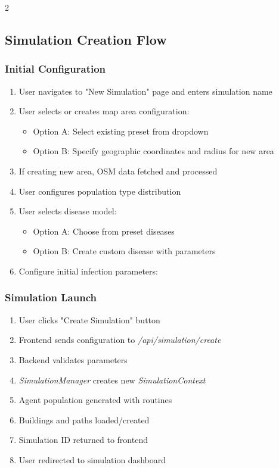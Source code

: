 \begin{multicols}{2}
\subsection{Simulation Creation Flow}

\subsubsection*{Initial Configuration}
\begin{enumerate}
    \item User navigates to "New Simulation" page and enters simulation name
    \item User selects or creates map area configuration:
    \begin{itemize}
        \item Option A: Select existing preset from dropdown
        \item Option B: Specify geographic coordinates and radius for new area
    \end{itemize}
    \item If creating new area, OSM data fetched and processed
    \item User configures population type distribution
     \item User selects disease model:
    \begin{itemize}
        \item Option A: Choose from preset diseases
        \item Option B: Create custom disease with parameters
    \end{itemize}
    \item Configure initial infection parameters:
\end{enumerate}

\subsubsection*{Simulation Launch}
\begin{enumerate}
    \item User clicks "Create Simulation" button
    \item Frontend sends configuration to \textit{/api\allowbreak/simulation\allowbreak/create}
    \item Backend validates parameters
    \item \textit{SimulationManager} creates new \textit{SimulationContext}
    \item Agent population generated with routines
    \item Buildings and paths loaded/created
    \item Simulation ID returned to frontend
    \item User redirected to simulation dashboard
\end{enumerate}


\end{multicols}
